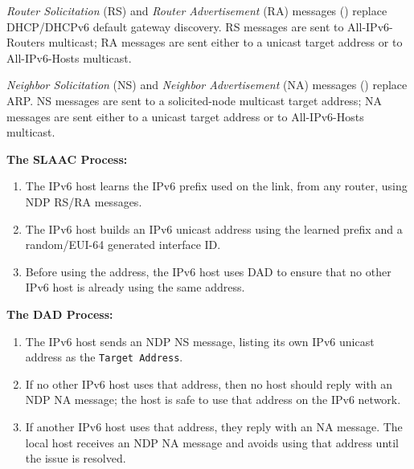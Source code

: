 \documentclass[12pt]{article}
\begin{document}
	\textit{Router Solicitation} (RS) and \textit{Router Advertisement} (RA) messages () replace DHCP/DHCPv6 default gateway discovery. RS messages are sent to All-IPv6-Routers multicast; RA messages are sent either to a unicast target address or to All-IPv6-Hosts multicast.

	\textit{Neighbor Solicitation} (NS) and \textit{Neighbor Advertisement} (NA) messages () replace ARP. NS messages are sent to a solicited-node multicast target address; NA messages are sent either to a unicast target address or to All-IPv6-Hosts multicast.

	\textbf{The SLAAC Process:}
	\begin{enumerate}[leftmargin=*, itemsep=-5pt]
		\label{itm:NDP SLAAC}
		\item{The IPv6 host learns the IPv6 prefix used on the link, from any router, using NDP RS/RA messages.}
		\item{The IPv6 host builds an IPv6 unicast address using the learned prefix and a random/EUI-64 generated interface ID.}
		\item{Before using the address, the IPv6 host uses DAD to ensure that no other IPv6 host is already using the same address.}
	\end{enumerate}

	\textbf{The DAD Process:}
	\begin{enumerate}[leftmargin=*, itemsep=-5pt]
		\label{itm:NDP DAD}
		\item{The IPv6 host sends an NDP NS message, listing its own IPv6 unicast address as the \texttt{Target Address}.}
		\item{If no other IPv6 host uses that address, then no host should reply with an NDP NA message; the host is safe to use that address on the IPv6 network.}
		\item{If another IPv6 host uses that address, they reply with an NA message. The local host receives an NDP NA message and avoids using that address until the issue is resolved.}
	\end{enumerate}
\end{document}
